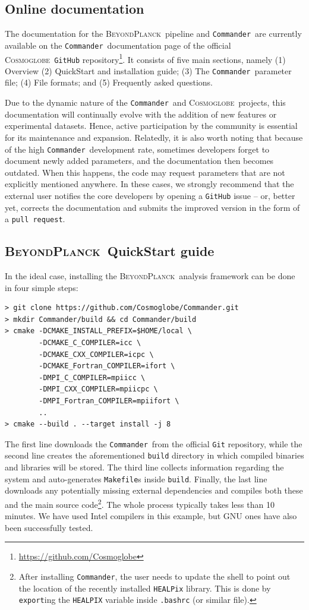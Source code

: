 \documentclass[twocolumn]{openjournal}
\def\commander{\texttt{Commander}}
\newcommand{\BP}{\textsc{BeyondPlanck}}
\newcommand{\cosmoglobe}{\textsc{Cosmoglobe}}
\begin{document}
\subsection{Online documentation}
\label{sec:docs}

The documentation for the \BP\ pipeline and \commander\ are currently available
on the \commander\ documentation page of the official \cosmoglobe\
\texttt{GitHub} repository\footnote{\url{https://github.com/Cosmoglobe}}. It
consists of five main sections, namely (1) Overview (2) QuickStart and
installation guide; (3) The \commander\ parameter file; (4) File formats; and
(5) Frequently asked questions.

Due to the dynamic nature of the \commander\ and \cosmoglobe\ projects, this
documentation will continually evolve with the addition of new features or
experimental datasets. Hence, active participation by the community is
essential for its maintenance and expansion. Relatedly, it is also worth noting
that because of the high \commander\ development rate, sometimes developers
forget to document newly added parameters, and the documentation then becomes
outdated. When this happens, the code may request parameters that are not
explicitly mentioned anywhere. In these cases, we strongly recommend that the
external user notifies the core developers by opening a \texttt{GitHub} issue
-- or, better yet, corrects the documentation and submits the improved version
in the form of a \texttt{pull request}.

\subsection{\BP\ QuickStart guide}
\label{sec:quickstart}

In the ideal case, installing the \BP\ analysis framework can be done
in four simple steps:
{\small
\begin{verbatim}
> git clone https://github.com/Cosmoglobe/Commander.git 
> mkdir Commander/build && cd Commander/build
> cmake -DCMAKE_INSTALL_PREFIX=$HOME/local \
        -DCMAKE_C_COMPILER=icc \
        -DCMAKE_CXX_COMPILER=icpc \
        -DCMAKE_Fortran_COMPILER=ifort \
        -DMPI_C_COMPILER=mpiicc \
        -DMPI_CXX_COMPILER=mpiicpc \
        -DMPI_Fortran_COMPILER=mpiifort \
        ..
> cmake --build . --target install -j 8
\end{verbatim}}
\noindent The first line downloads the \commander\ from the official
\texttt{Git} repository, while the second line creates the aforementioned
\texttt{build} directory in which compiled binaries and libraries will be
stored. The third line collects information regarding the system and
auto-generates \texttt{Makefile}s inside \texttt{build}. Finally, the last line
downloads any potentially missing external dependencies and compiles both these
and the main source code\footnote{After installing \commander, the user needs
to update the shell to point out the location of the recently installed
\texttt{HEALPix} library. This is done by \texttt{export}ing the
\texttt{HEALPIX} variable inside \texttt{.bashrc} (or similar file).}. The
whole process typically takes less than 10 minutes. We have used Intel
compilers in this example, but GNU ones have also been successfully tested.
\end{document}
